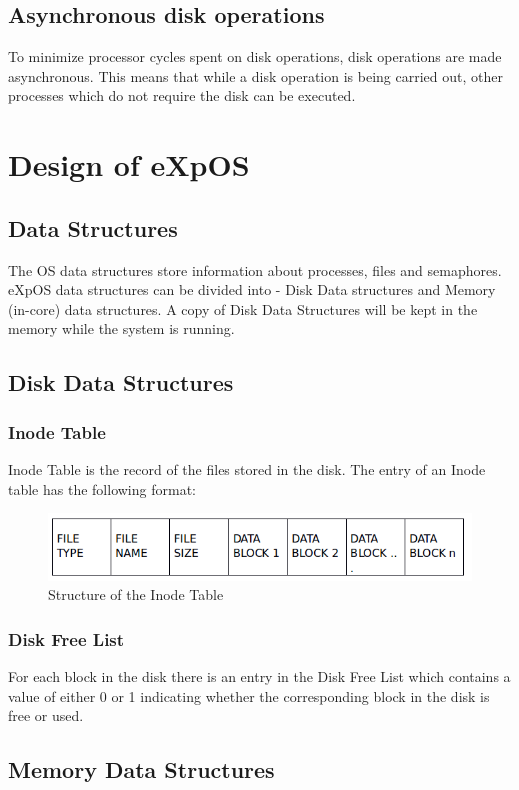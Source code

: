 \documentclass[10pt]{article}
\begin{document}
\subsection{Asynchronous disk operations}

To minimize processor cycles spent on disk operations, disk operations are made asynchronous. This means that while a disk operation is being carried out, other processes which do not require the disk can be executed.
\section{Design of eXpOS}
\subsection{Data Structures}

The OS data structures store information about processes, files and semaphores. eXpOS data structures can be divided into - Disk Data structures and Memory (in-core) data structures. A copy of Disk Data Structures will be kept in the memory while the system is running.
\subsection{Disk Data Structures}
\subsubsection{Inode Table}

Inode Table is the record of the files stored in the disk. The entry of an Inode table has the following format:
\begin{figure}[ht]
\centering
\includegraphics[scale=0.50]{Inode_table.png}
\caption{\footnotesize Structure of the Inode Table}
\label{fig_1}
\end{figure}
\subsubsection{Disk Free List}

For each block in the disk there is an entry in the Disk Free List which contains a value of either 0 or 1 indicating whether the corresponding block in the disk is free or used.
\subsection{Memory Data Structures}
\end{document}
